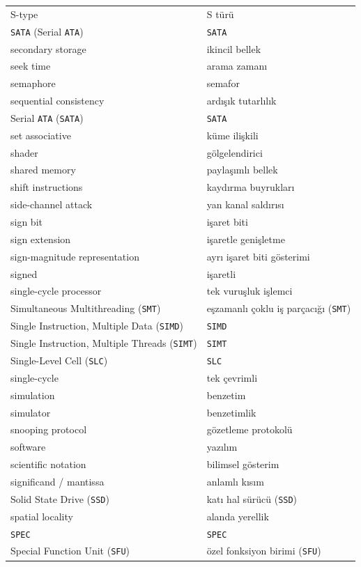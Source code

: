 {\begin{longtable}{@{}p{7.6cm}p{7.6cm}@{}}
S-type & S türü \\
\texttt{SATA} (Serial \texttt{ATA}) & \texttt{SATA} \\
secondary storage & ikincil bellek \\
seek time & arama zamanı \\
semaphore & semafor \\
sequential consistency & ardışık tutarlılık \\
Serial \texttt{ATA} (\texttt{SATA}) & \texttt{SATA} \\
set associative & küme ilişkili \\
shader & gölgelendirici \\
shared memory & paylaşımlı bellek \\
shift instructions & kaydırma buyrukları \\
side-channel attack & yan kanal saldırısı \\
sign bit & işaret biti \\
sign extension & işaretle genişletme \\
sign-magnitude representation & ayrı işaret biti gösterimi \\
signed & işaretli \\
single-cycle processor & tek vuruşluk işlemci \\
Simultaneous Multithreading (\texttt{SMT}) & eşzamanlı çoklu iş parçacığı (\texttt{SMT}) \\
Single Instruction, Multiple Data (\texttt{SIMD}) & \texttt{SIMD} \\
Single Instruction, Multiple Threads (\texttt{SIMT}) & \texttt{SIMT} \\
Single-Level Cell (\texttt{SLC}) & \texttt{SLC} \\
single-cycle & tek çevrimli \\
simulation & benzetim \\
simulator & benzetimlik \\
snooping protocol & gözetleme protokolü \\
software & yazılım \\
scientific notation & bilimsel gösterim \\
significand / mantissa & anlamlı kısım \\
Solid State Drive (\texttt{SSD}) & katı hal sürücü (\texttt{SSD}) \\
spatial locality & alanda yerellik \\
\texttt{SPEC} & \texttt{SPEC} \\
Special Function Unit (\texttt{SFU}) & özel fonksiyon birimi (\texttt{SFU}) \\

\end{longtable}}
